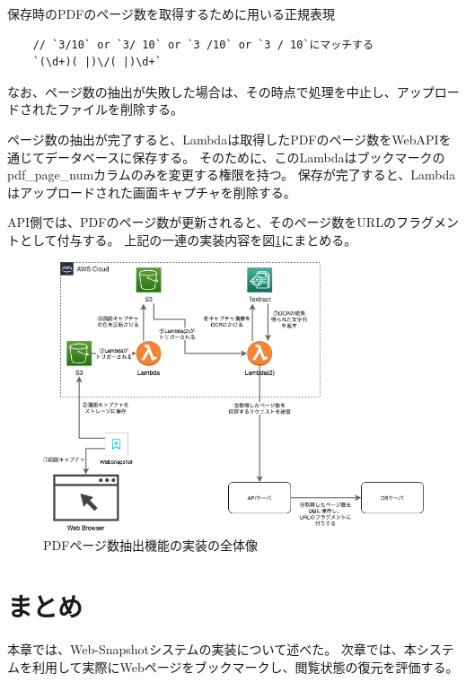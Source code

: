 \begin{itembox}[l]{保存時のPDFのページ数を取得するために用いる正規表現}
  \label{regix-pdf-page-num}
  \begin{verbatim}
    // `3/10` or `3/ 10` or `3 /10` or `3 / 10`にマッチする
    `(\d+)( |)\/( |)\d+`
  \end{verbatim}
\end{itembox}

なお、ページ数の抽出が失敗した場合は、その時点で処理を中止し、アップロードされたファイルを削除する。

ページ数の抽出が完了すると、Lambdaは取得したPDFのページ数をWebAPIを通じてデータベースに保存する。
そのために、このLambdaはブックマークのpdf\_page\_numカラムのみを変更する権限を持つ。
保存が完了すると、Lambdaはアップロードされた画面キャプチャを削除する。

API側では、PDFのページ数が更新されると、そのページ数をURLのフラグメントとして付与する。
上記の一連の実装内容を図\ref{fig:impl-pdf-overall}にまとめる。

\begin{figure}[htbp]
  \caption{PDFページ数抽出機能の実装の全体像}
  \label{fig:impl-pdf-overall}
  \begin{center}
    \includegraphics[bb=0 0 734 522,width=15cm]{img/050_implementation/server/impl-pdf-overall.pdf}
  \end{center}
\end{figure}

\section{まとめ}
本章では、Web-Snapshotシステムの実装について述べた。
次章では、本システムを利用して実際にWebページをブックマークし、閲覧状態の復元を評価する。